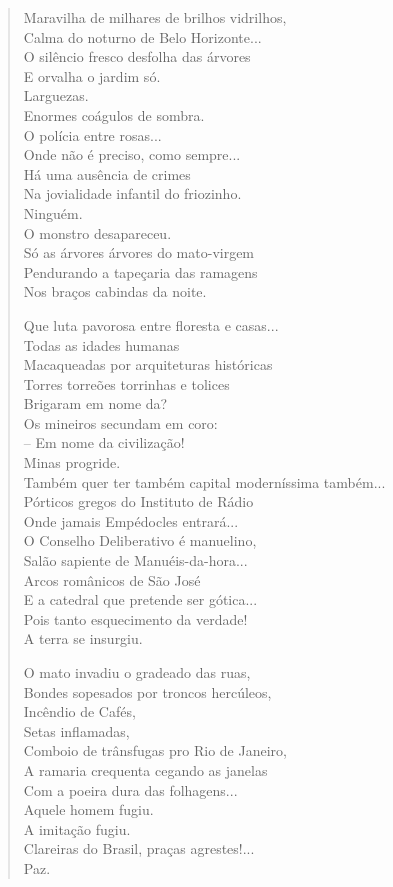 \begin{verse}
Maravilha de milhares de brilhos vidrilhos,\\
Calma do noturno de Belo Horizonte...\\
O silêncio fresco desfolha das árvores\\
E orvalha o jardim só.\\
Larguezas.\\
Enormes coágulos de sombra.\\
O polícia entre rosas...\\
\quad{}Onde não é preciso, como sempre...\\
Há uma ausência de crimes\\
Na jovialidade infantil do friozinho.\\
Ninguém.\\
O monstro desapareceu.\\
Só as árvores árvores do mato-virgem\\
Pendurando a tapeçaria das ramagens\\
Nos braços cabindas da noite.

Que luta pavorosa entre floresta e casas...\\
Todas as idades humanas\\
Macaqueadas por arquiteturas históricas\\
Torres torreões torrinhas e tolices\\
Brigaram em nome da?\\
Os mineiros secundam em coro:\\
-- Em nome da civilização!\\
Minas progride.\\
Também quer ter também capital moderníssima também...\\
Pórticos gregos do Instituto de Rádio\\
Onde jamais Empédocles entrará...\\
O Conselho Deliberativo é manuelino,\\
Salão sapiente de Manuéis-da-hora...\\
Arcos românicos de São José\\
E a catedral que pretende ser gótica...\\
Pois tanto esquecimento da verdade!\\
A terra se insurgiu.

O mato invadiu o gradeado das ruas,\\
Bondes sopesados por troncos hercúleos,\\
Incêndio de Cafés,\\
Setas inflamadas,\\
Comboio de trânsfugas pro Rio de Janeiro,\\
A ramaria crequenta cegando as janelas\\
Com a poeira dura das folhagens...\\
Aquele homem fugiu.\\
A imitação fugiu.\\
Clareiras do Brasil, praças agrestes!...\\
Paz.


\end{verse}
